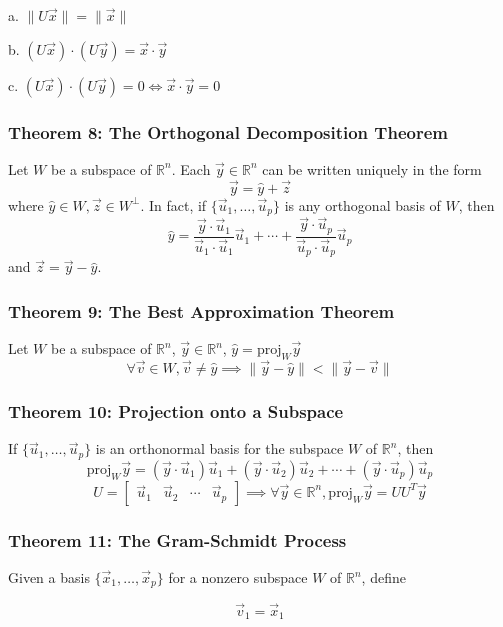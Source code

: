 \documentclass{article}
\begin{document}
a. $\|U \vec x\| = \| \vec x\|$

b. $(U \vec x)\cdot (U \vec y ) = \vec x \cdot \vec y$

c. $(U \vec x)\cdot (U \vec y) = 0 \iff \vec x \cdot \vec y = 0$

\subsubsection*{Theorem 8: The Orthogonal Decomposition Theorem}
Let $W$ be a subspace of $\mathbb R ^n$. Each $\vec y \in \mathbb R^n$ can be written uniquely in the form 
$$\vec y = \hat y + \vec z$$
where $\hat y \in W, \vec z \in W^\perp$. In fact, if $\{\vec u_1 , \dots , \vec u_p \}$ is any orthogonal basis of $W$, then 
$$\hat y = \frac{\vec y \cdot \vec u_1}{\vec u_1 \cdot \vec u_1} \vec u_1 + \cdots + \frac{\vec y \cdot \vec u_p}{\vec u_p \cdot \vec u_p} \vec u_p$$
and $\vec z = \vec y -\hat y$.

\subsubsection*{Theorem 9: The Best Approximation Theorem}
Let $W$ be a subspace of $\mathbb R^n$, $\vec y \in \mathbb R^n$, $\hat y = \text{proj}_W \vec y$
$$\forall \vec v \in W, \vec v \neq \hat y \implies \|\vec y - \hat y \| < \|\vec y - \vec v\|$$

\subsubsection*{Theorem 10: Projection onto a Subspace}
If $\{ \vec u _1 , \dots , \vec u_p \}$ is an orthonormal basis for the subspace $W$ of $\mathbb R ^n$, then 
$$\text{proj}_W \vec y = (\vec y \cdot \vec u_1)\vec u_1 +(\vec y \cdot \vec u_2)\vec u_2 + \cdots + (\vec y \cdot \vec u_p)\vec u_p$$
$$U = \begin{bmatrix}
    \vec u_1 & \vec u_2 &\cdots & \vec u_p
\end{bmatrix} \implies \forall \vec y \in \mathbb R^n ,\text{proj}_W \vec y = UU^T \vec y$$

\subsubsection*{Theorem 11: The Gram-Schmidt Process}
Given a basis $\{ \vec x_1 , \dots , \vec x_p \}$ for a nonzero subspace $W$ of $\mathbb R^n$, define

$$\vec v_1 = \vec x_1$$
\end{document}
